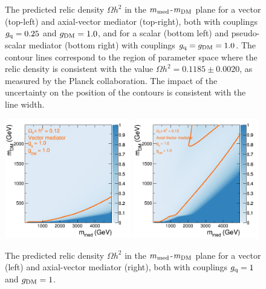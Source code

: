 \begin{center}
\begin{figure}[h]
\caption{The predicted relic density $\Omega h^{2}$ in the $m_{\rm med}$-$m_{\rm DM}$ plane for a vector (top-left) and axial-vector mediator (top-right), both with couplings $g_{\rm q}=0.25$ and $g_{\rm DM}=1.0$, and for a scalar (bottom left) and pseudo-scalar mediator (bottom right) with couplings $g_{\rm q}=g_{\rm DM}=1.0$.
The contour lines correspond to the region of parameter space where the relic density is consistent with the value $\Omega h^2=0.1185 \pm 0.0020$, as measured by the Planck collaboration. The impact of the uncertainty on the position of the contours is consistent with the line width.}
\label{fig:DMBounds}
\end{figure}
\end{center}

\begin{center}
\begin{figure}[h]
\includegraphics[width=0.49\textwidth]{figures/scan_V_g1_MD_xxd_V_gq1.png} 
\includegraphics[width=0.49\textwidth]{figures/scan_A_g1_MD_xxd_A_gq1.png} \\
\caption{The predicted relic density $\Omega h^{2}$ in the $m_{\rm med}$-$m_{\rm DM}$ plane for a vector (left) and axial-vector mediator (right), both with couplings $g_{\rm q}=1$ and $g_{\rm DM}=1$.}
\label{fig:DMBoundsg1}
\end{figure}
\end{center}


